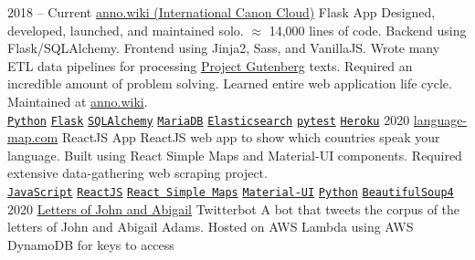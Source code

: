 \documentclass[9pt]{developercv} %
\begin{document}


\begin{entrylist}
	\entry
		{2018 -- Current}
        {{\href{https://github.com/malan88/icc}{anno.wiki (International Canon Cloud)}}}
		{Flask App}
        {Designed, developed, launched, and maintained solo. $\approx$ 14,000
        lines of code. Backend using Flask/SQLAlchemy. Frontend using Jinja2,
        Sass, and VanillaJS. Wrote many ETL data pipelines for processing
        {\href{https://gutenberg.org}{Project Gutenberg}} texts. Required an
        incredible amount of problem solving. Learned entire web application
        life cycle. Maintained at {\href{https://anno.wiki}{anno.wiki}}.
        \\
        \texttt{{\href{https://www.python.org/}{Python}}}\slashsep
        \texttt{{\href{https://flask.palletsprojects.com/en/1.1.x/}{Flask}}}\slashsep
        \texttt{{\href{https://www.sqlalchemy.org/}{SQLAlchemy}}}\slashsep
        \texttt{{\href{https://mariadb.org/}{MariaDB}}}\slashsep
        \texttt{{\href{https://www.elastic.co/}{Elasticsearch}}}\slashsep
        \texttt{{\href{https://docs.pytest.org/en/stable/}{pytest}}}\slashsep
        \texttt{{\href{https://www.heroku.com/}{Heroku}}}
        }
    \entry
        {2020}
        {\href{https://language-map.com}{language-map.com}}
        {ReactJS App}
        {
            ReactJS web app to show which countries speak your language. Built
            using React Simple Maps and Material-UI components. Required
            extensive data-gathering web scraping project.
        \\
        \texttt{{\href{https://en.wikipedia.org/wiki/JavaScript}{JavaScript}}}\slashsep
        \texttt{{\href{https://reactjs.org/}{ReactJS}}}\slashsep
        \texttt{{\href{https://www.react-simple-maps.io/}{React Simple Maps}}}\slashsep
        \texttt{{\href{https://material-ui.com/}{Material-UI}}}\slashsep
        \texttt{{\href{https://www.python.org/}{Python}}}\slashsep
        \texttt{{\href{https://www.crummy.com/software/BeautifulSoup/}{BeautifulSoup4}}}
        }
	\entry
		{2020}
        {{\href{https://twitter.com/john_and_abbie}{Letters of John and Abigail}}}
		{Twitterbot}
        {
            A bot that tweets the corpus of the letters of John and Abigail
            Adams. Hosted on AWS Lambda using AWS DynamoDB for keys to access
}
\end{entrylist}
\end{document}
